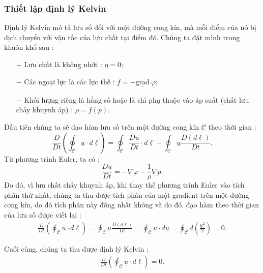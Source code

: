 \documentclass[THUY_DONG_HOC.tex]{subfiles}
\begin{document}
\subsubsection{Thiết lập định lý Kelvin}
Định lý Kelvin mô tả lưu số đối với một đường cong kín, mà mỗi điểm của nó bị dịch chuyển với vận tốc của lưu chất tại điểm đó. Chúng ta đặt mình trong khuôn khổ sau :
\begin{itemize}
	\item[$-$] Lưu chất là không nhớt : $\eta=0$;
	\item[$-$] Các ngoại lực là các lực thế : $\underline{f}=-\underline{\text{grad}}\ \underline{\varphi}$;
	\item[$-$] Khối lượng riêng là hằng số hoặc là chỉ phụ thuộc vào áp suất (chất lưu chảy khuynh áp) : $\rho=f(p)$.
\end{itemize}

Đầu tiên chúng ta sẽ đạo hàm lưu số trên một đường cong kín $\mathcal{C}$ theo thời gian :
\[\frac{D}{{Dt}}\left( {\oint_\mathcal{C} {\underline u }  \cdot d\underline \ell } \right) = \oint_\mathcal{C} {\frac{{D\underline u }}{{Dt}} \cdot d\underline \ell }  + \oint_\mathcal{C} {\underline u \frac{{D\left( {d\underline \ell } \right)}}{{Dt}}}.\]
Từ phương trình Euler, ta có :
\[\frac{{D\underline u }}{{Dt}} =  - \underline \nabla  \varphi  - \frac{1}{\rho }\underline \nabla  p.\]
Do đó, vì lưu chất chảy khuynh áp, khi thay thế phương trình Euler vào tích phân thứ nhất, chúng ta thu được tích phân của một gradient trên một đường cong kín, do đó tích phân này đồng nhất không và do đó, đạo hàm theo thời gian của lưu số được viết lại :
\[
\begin{aligned}
\frac{D}{{Dt}}\left( {\oint_\mathcal{C} {\underline u }  \cdot d\underline \ell } \right) = \oint_\mathcal{C} {\underline u \frac{{D\left( {d\underline \ell } \right)}}{{Dt}}}=\oint_\mathcal{C}\underline{u}\cdot d\underline{u}=\oint_\mathcal{C}d\left(\frac{\underline{u}^2}{2}\right)=0.
\end{aligned}
\]

Cuối cùng, chúng ta thu được định lý Kelvin :
\begin{equation}
	\begin{aligned}
		\boxed{
			\frac{D}{{Dt}}\left( {\oint_\mathcal{C} {\underline u }  \cdot d\underline \ell }\right)=0
		}.
	\end{aligned}
\end{equation}
\end{document}

